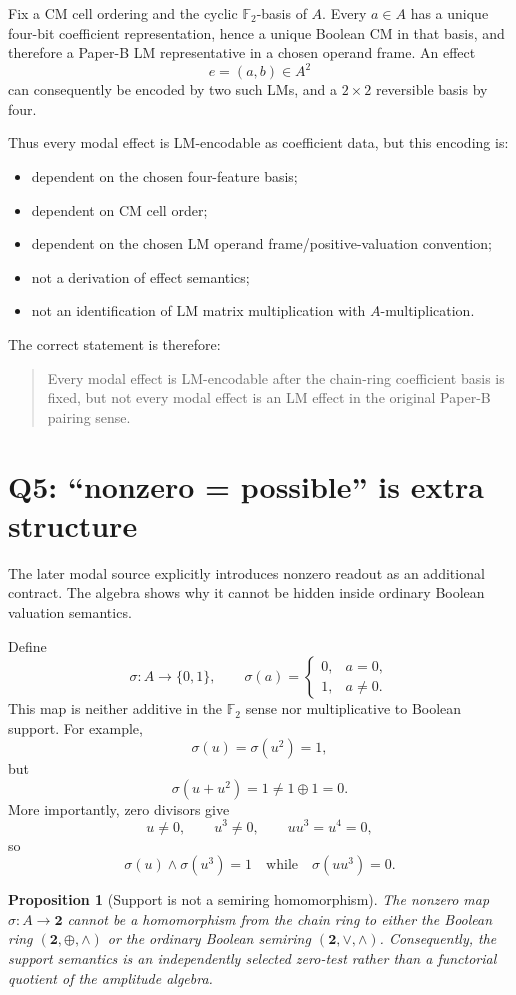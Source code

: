 \documentclass[11pt]{article}
\newtheorem{proposition}[theorem]{Proposition}
\theoremstyle{definition}
\newcommand{\F}{\mathbb{F}}
\newcommand{\Bool}{\mathbf{2}}
\begin{document}
Fix a CM cell ordering and the cyclic \(\F_2\)-basis of \(A\). Every \(a\in A\) has a unique four-bit
coefficient representation, hence a unique Boolean CM in that basis, and therefore a Paper-B LM
representative in a chosen operand frame. An effect
\[
e=(a,b)\in A^2
\]
can consequently be encoded by two such LMs, and a \(2\times2\) reversible basis by four.

Thus every modal effect is LM-encodable as coefficient data, but this encoding is:
\begin{itemize}
\item dependent on the chosen four-feature basis;
\item dependent on CM cell order;
\item dependent on the chosen LM operand frame/positive-valuation convention;
\item not a derivation of effect semantics;
\item not an identification of LM matrix multiplication with \(A\)-multiplication.
\end{itemize}

The correct statement is therefore:
\begin{quote}
Every modal effect is LM-encodable after the chain-ring coefficient basis is fixed, but not every modal
effect is an LM effect in the original Paper-B pairing sense.
\end{quote}

\section{Q5: ``nonzero = possible'' is extra structure}

The later modal source explicitly introduces nonzero readout as an additional contract. The algebra
shows why it cannot be hidden inside ordinary Boolean valuation semantics.

Define
\[
\sigma:A\to\{0,1\},\qquad
\sigma(a)=\begin{cases}0,&a=0,\\1,&a\neq0.\end{cases}
\]
This map is neither additive in the \(\F_2\) sense nor multiplicative to Boolean support.
For example,
\[
\sigma(u)=\sigma(u^2)=1,
\]
but
\[
\sigma(u+u^2)=1\neq1\oplus1=0.
\]
More importantly, zero divisors give
\[
u\neq0,\qquad u^3\neq0,\qquad uu^3=u^4=0,
\]
so
\[
\sigma(u)\land\sigma(u^3)=1
\quad\text{while}\quad
\sigma(uu^3)=0.
\]

\begin{proposition}[Support is not a semiring homomorphism]
The nonzero map \(\sigma:A\to\Bool\) cannot be a homomorphism from the chain ring to either the
Boolean ring \((\Bool,\oplus,\land)\) or the ordinary Boolean semiring \((\Bool,\lor,\land)\).
Consequently, the support semantics is an independently selected zero-test rather than a functorial
quotient of the amplitude algebra.
\end{proposition}
\end{document}
